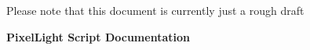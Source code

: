 \thispagestyle{empty}
\begin{center}

Please note that this document is currently just a rough draft

{\Huge \textbf{PixelLight Script Documentation}}\\


\end{center}
